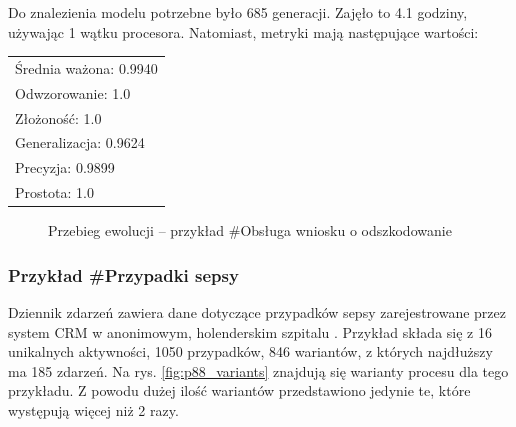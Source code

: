 Do znalezienia modelu potrzebne było 685 generacji. Zajęło to 4.1 godziny, używając 1 wątku procesora. Natomiast, metryki mają następujące wartości: 

 \begin{center}
  \begin{tabular}{l}
	Średnia ważona: 0.9940 \\
	Odwzorowanie: 1.0 \\
	Złożoność: 1.0 \\
	Generalizacja: 0.9624 \\
	Precyzja: 0.9899 \\
	Prostota: 1.0
  \end{tabular}
 \end{center}
 
\begin{figure}[H]
	\caption{\label{fig:p5_chart}Przebieg ewolucji -- przykład \#Obsługa wniosku o odszkodowanie}
\end{figure}

\subsubsection{Przykład \#Przypadki sepsy}
\label{sec:example5}
Dziennik zdarzeń zawiera dane dotyczące przypadków sepsy zarejestrowane przez system CRM w anonimowym, holenderskim szpitalu \cite{sepsis-cases}.
Przykład składa się z 16 unikalnych aktywności, 1050 przypadków, 846 wariantów, z których najdłuższy ma 185 zdarzeń. Na rys. \ref{fig:p88_variants} znajdują się warianty procesu dla tego przykładu. Z powodu dużej ilość wariantów przedstawiono jedynie te, które występują więcej niż 2 razy.

